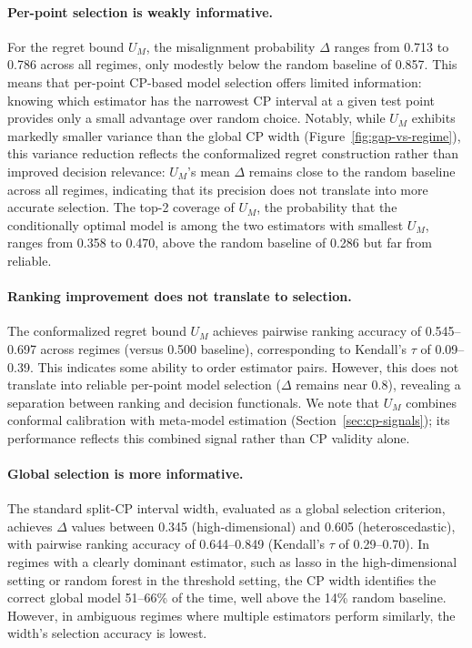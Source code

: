 \documentclass[pdflatex,sn-mathphys-ay]{sn-jnl}%
\theoremstyle{thmstyleone}%
\theoremstyle{thmstyletwo}%
\theoremstyle{thmstylethree}%
\begin{document}
\paragraph{Per-point selection is weakly informative.} For the regret bound $U_M$, the misalignment probability $\Delta$ ranges from 0.713 to 0.786 across all regimes, only modestly below the random baseline of 0.857. This means that per-point CP-based model selection offers limited information: knowing which estimator has the narrowest CP interval at a given test point provides only a small advantage over random choice. Notably, while $U_M$ exhibits markedly smaller variance than the global CP width (Figure~\ref{fig:gap-vs-regime}), this variance reduction reflects the conformalized regret construction rather than improved decision relevance: $U_M$'s mean $\Delta$ remains close to the random baseline across all regimes, indicating that its precision does not translate into more accurate selection. The top-2 coverage of $U_M$, the probability that the conditionally optimal model is among the two estimators with smallest $U_M$, ranges from 0.358 to 0.470, above the random baseline of 0.286 but far from reliable.

\paragraph{Ranking improvement does not translate to selection.}
The conformalized regret bound $U_M$ achieves pairwise ranking accuracy of 0.545--0.697 across regimes (versus 0.500 baseline), corresponding to Kendall's $\tau$ of 0.09--0.39. This indicates some ability to order estimator pairs. However, this does not translate into reliable per-point model selection ($\Delta$ remains near 0.8), revealing a separation between ranking and decision functionals. We note that $U_M$ combines conformal calibration with meta-model estimation (Section~\ref{sec:cp-signals}); its performance reflects this combined signal rather than CP validity alone.

\paragraph{Global selection is more informative.}
The standard split-CP interval width, evaluated as a global selection criterion, achieves $\Delta$ values between 0.345 (high-dimensional) and 0.605 (heteroscedastic), with pairwise ranking accuracy of 0.644--0.849 (Kendall's $\tau$ of 0.29--0.70). In regimes with a clearly dominant estimator, such as lasso in the high-dimensional setting or random forest in the threshold setting, the CP width identifies the correct global model 51--66\% of the time, well above the 14\% random baseline. However, in ambiguous regimes where multiple estimators perform similarly, the width's selection accuracy is lowest.
\end{document}
